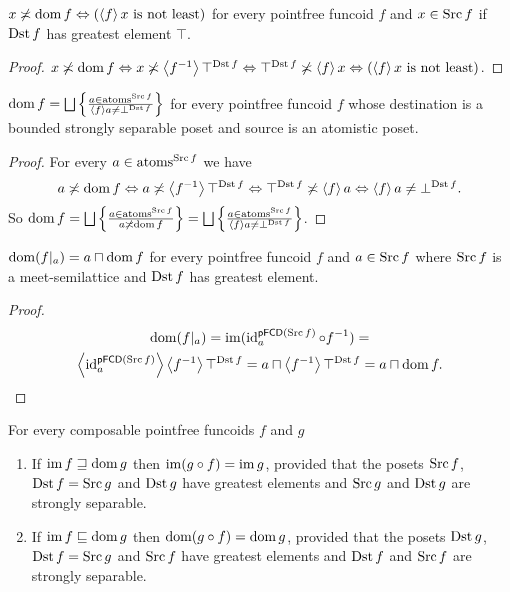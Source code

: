 \begin{prop}
$x\not\asymp\operatorname{dom} f\Leftrightarrow(\left\langle f\right\rangle x\text{ is not least})$ for
every pointfree funcoid $f$ and $x\in\operatorname{Src} f$ if $\operatorname{Dst} f$ has greatest
element $\top$.\end{prop}
\begin{proof}
$x\not\asymp\operatorname{dom} f\Leftrightarrow x\not\asymp\left\langle f^{-1}\right\rangle\top^{\operatorname{Dst} f}\Leftrightarrow\top^{\operatorname{Dst} f}\not\asymp\left\langle f\right\rangle x\Leftrightarrow(\left\langle f\right\rangle x\text{ is not least})$.\end{proof}
\begin{prop}
$\dom f=\bigsqcup\setcond{a\in\atoms^{\Src f}}{\supfun fa\ne\bot^{\Dst f}}$
for every pointfree funcoid $f$ whose destination is a bounded strongly separable poset
and source is an atomistic poset.\end{prop}
\begin{proof}
For every $a\in\operatorname{atoms}^{\operatorname{Src} f}$ we have 
\[
a\not\asymp\operatorname{dom} f\Leftrightarrow a\not\asymp\left\langle f^{-1}\right\rangle\top^{\operatorname{Dst} f}\Leftrightarrow\top^{\operatorname{Dst} f}\not\asymp\left\langle f\right\rangle a\Leftrightarrow\left\langle f\right\rangle a\ne\bot^{\operatorname{Dst} f}.
\]
So $\dom f=\bigsqcup\setcond{a\in\atoms^{\Src f}}{a\nasymp\dom f}=\bigsqcup\setcond{a\in\atoms^{\Src f}}{\supfun fa\ne\bot^{\Dst f}}$.\end{proof}
\begin{prop}
$\operatorname{dom}(f|_{a})=a\sqcap\operatorname{dom} f$ for every pointfree funcoid $f$ and
$a\in\operatorname{Src} f$ where $\operatorname{Src} f$ is a meet-semilattice and
$\operatorname{Dst} f$ has greatest element.\end{prop}
\begin{proof}
~
\begin{multline*}
\operatorname{dom}(f|_{a})=\operatorname{im}(\operatorname{id}_{a}^{\mathsf{pFCD}(\operatorname{Src} f)}\circ f^{-1})=\\
\left\langle \operatorname{id}_{a}^{\mathsf{pFCD}(\operatorname{Src} f)}\right\rangle\left\langle f^{-1}\right\rangle\top^{\operatorname{Dst} f}=a\sqcap\left\langle f^{-1}\right\rangle\top^{\operatorname{Dst} f}=a\sqcap\operatorname{dom} f.
\end{multline*}
\end{proof}
\begin{prop}
For every composable pointfree funcoids $f$ and $g$
\begin{enumerate}
\item \label{pf-im-ge-dom}If $\operatorname{im} f\sqsupseteq\operatorname{dom} g$ then $\operatorname{im}(g\circ f)=\operatorname{im} g$, provided that
the posets $\operatorname{Src} f$, $\operatorname{Dst} f=\operatorname{Src} g$ and $\operatorname{Dst} g$ have greatest elements and $\operatorname{Src} g$ and $\operatorname{Dst} g$ are strongly separable.
\item \label{pf-im-le-dom}If $\operatorname{im} f\sqsubseteq\operatorname{dom} g$ then $\operatorname{dom}(g\circ f)=\operatorname{dom} g$, provided that
the posets $\operatorname{Dst} g$, $\operatorname{Dst} f=\operatorname{Src} g$ and $\operatorname{Src} f$ have greatest elements and $\operatorname{Dst} f$ and $\operatorname{Src} f$ are strongly separable.
\end{enumerate}
\end{prop}
